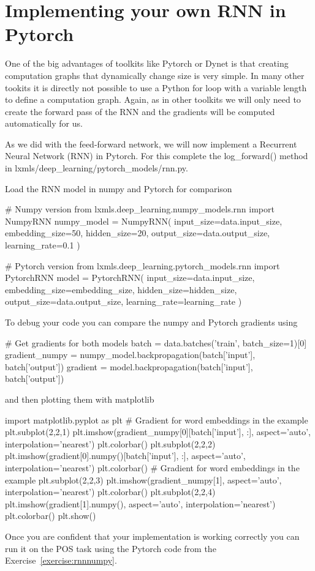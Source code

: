 \clearpage
\section{Implementing your own RNN in Pytorch}

One of the big advantages of toolkits like Pytorch or Dynet is that creating computation graphs that dynamically change size is very simple. In many other tookits it is directly not possible to use a Python for loop with a variable length to define a computation graph. Again, as in other toolkits we will only need to create the forward pass of the RNN and the gradients will be computed automatically for us.

\begin{exercise}
As we did with the feed-forward network, we will now implement a
Recurrent Neural Network (RNN) in Pytorch. For this complete the
log\_forward() method in lxmls/deep\_learning/pytorch\_models/rnn.py.

\noindent Load the RNN model in numpy and Pytorch for comparison
\begin{python}
# Numpy version
from lxmls.deep_learning.numpy_models.rnn import NumpyRNN
numpy_model = NumpyRNN(
    input_size=data.input_size,
    embedding_size=50,
    hidden_size=20,
    output_size=data.output_size,
    learning_rate=0.1
)

# Pytorch version
from lxmls.deep_learning.pytorch_models.rnn import PytorchRNN
model = PytorchRNN(
    input_size=data.input_size,
    embedding_size=embedding_size,
    hidden_size=hidden_size,
    output_size=data.output_size,
    learning_rate=learning_rate
)
\end{python}
\noindent To debug your code you can compare the numpy and Pytorch gradients using
\begin{python}
# Get gradients for both models
batch = data.batches('train', batch_size=1)[0]
gradient_numpy = numpy_model.backpropagation(batch['input'], batch['output'])
gradient = model.backpropagation(batch['input'], batch['output'])
\end{python}
\noindent and then plotting them with matplotlib
\begin{python}
import matplotlib.pyplot as plt
# Gradient for  word embeddings in the example
plt.subplot(2,2,1)
plt.imshow(gradient_numpy[0][batch['input'], :], aspect='auto', interpolation='nearest')
plt.colorbar()
plt.subplot(2,2,2)
plt.imshow(gradient[0].numpy()[batch['input'], :], aspect='auto', interpolation='nearest')
plt.colorbar()
# Gradient for  word embeddings in the example
plt.subplot(2,2,3)
plt.imshow(gradient_numpy[1], aspect='auto', interpolation='nearest')
plt.colorbar()
plt.subplot(2,2,4)
plt.imshow(gradient[1].numpy(), aspect='auto', interpolation='nearest')
plt.colorbar()
plt.show()
\end{python}
Once you are confident that your implementation is working correctly you can run it on the POS task using the Pytorch code from the Exercise~\ref{exercise:rnnnumpy}. 
\end{exercise}

